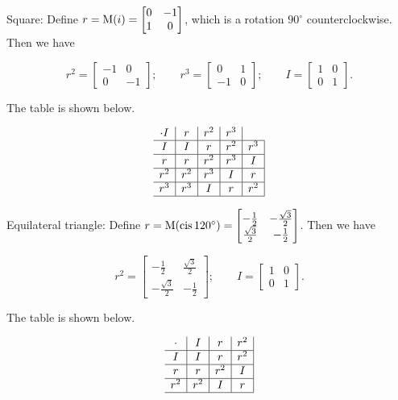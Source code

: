 \documentclass[../gatm_answers.tex]{subfiles}
\begin{document}
Square: Define $r=\operatorname{M}(i) = \begin{bmatrix} 0 & -1 \\ 1 & 0 \end{bmatrix}$, which is a rotation $90^\circ$ counterclockwise. Then we have

$$r^2 = \begin{bmatrix} -1 & 0 \\ 0 & -1 \end{bmatrix};\qquad r^3 = \begin{bmatrix} 0 & 1 \\ -1 & 0 \end{bmatrix};\qquad I = \begin{bmatrix} 1 & 0 \\ 0 & 1 \end{bmatrix}.$$

The table is shown below.

$$\begin{array}{c|c|c|c|c|}
\cdot I & r & r^2 & r^3 \\ \hline
I & I & r & r^2 & r^3 \\ \hline
r & r & r^2 & r^3 & I \\ \hline
r^2 & r^2 & r^3 & I & r \\ \hline
r^3 & r^3 & I & r & r^2 \\ \hline
\end{array}$$

Equilateral triangle: Define $r=\operatorname{M}(\operatorname{cis} 120^\circ)=\begin{bmatrix} -\frac{1}{2} & -\frac{\sqrt{3}}{2} \\ \frac{\sqrt{3}}{2} & -\frac{1}{2}\end{bmatrix}$. Then we have

$$r^2 = \begin{bmatrix} -\frac{1}{2} & \frac{\sqrt{3}}{2} \\ -\frac{\sqrt{3}}{2} & -\frac{1}{2}\end{bmatrix};\qquad I = \begin{bmatrix} 1 & 0 \\ 0 & 1 \end{bmatrix}.$$

The table is shown below.

$$\begin{array}{c|c|c|c|}
\cdot & I & r & r^2 \\ \hline
I & I & r & r^2 \\ \hline
r & r & r^2 & I \\ \hline
r^2 & r^2 & I & r \\ \hline
\end{array}$$
\end{document}
